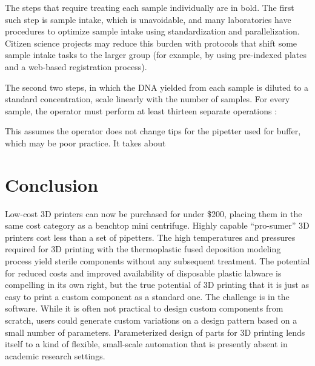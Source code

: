 \begin{refsection}
\noindent The steps that require treating each sample individually are in bold. The first such step is sample intake, which is unavoidable, and many laboratories have procedures to optimize sample intake using standardization and parallelization. Citizen science projects may reduce this burden with protocols that shift some sample intake tasks to the larger group (for example, by using pre-indexed plates and a web-based registration process). 

The second two steps, in which the DNA yielded from each sample is diluted to a standard concentration, scale linearly with the number of samples. For every sample, the operator must perform at least thirteen separate operations :



\noindent This assumes the operator does not change tips for the pipetter used for buffer, which may be poor practice. It takes about 

\section{Conclusion}


Low-cost 3D printers can now be purchased for under \$200, placing them in the same cost category as a benchtop mini centrifuge. Highly capable ``pro-sumer'' 3D printers cost less than a set of pipetters. The high temperatures and pressures required for 3D printing with the thermoplastic fused deposition modeling process yield sterile components without any subsequent treatment. The potential for reduced costs and improved availability of disposable plastic labware is compelling in its own right, but the true potential of 3D printing that it is just as easy to print a custom component as a standard one. The challenge is in the software. While it is often not practical to design custom components from scratch, users could generate custom variations on a design pattern based on a small number of parameters. Parameterized design of parts for 3D printing lends itself to a kind of flexible, small-scale automation that is presently absent in academic research settings.

\printbibliography[heading=subbibliography]

\end{refsection}